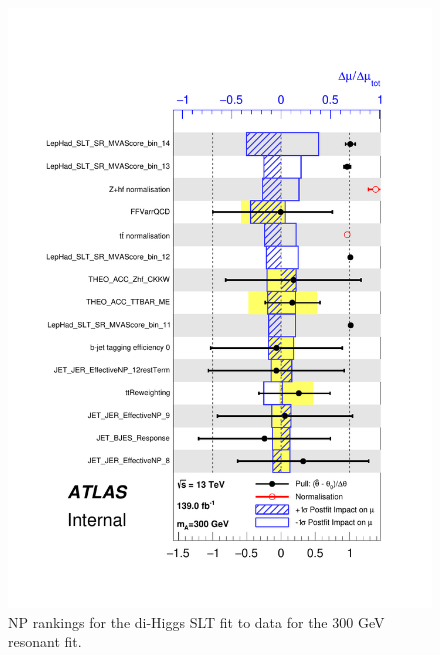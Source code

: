 \begin{figure}
\centering
\includegraphics[width=.8\textwidth]{figures/results/HH/LepHad/pulls_SigXsecOverSM_300_SLT.pdf}
\caption{NP rankings for the di-Higgs \lephad SLT fit to data for the 300 GeV resonant fit.}
\label{fig:LepHadPostfitNPRankings2HDM300SLT}
\end{figure}


